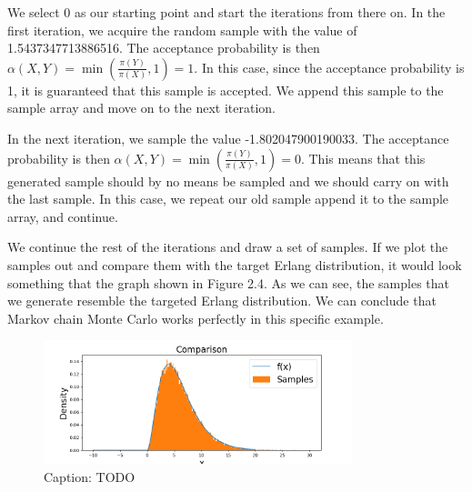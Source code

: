 We select 0 as our starting point and start the iterations from there on. In the first iteration, we acquire the random sample with the value of 1.5437347713886516. The acceptance probability is then $\alpha(X, Y) = \min (\frac{\pi(Y)}{\pi(X)}, 1) = 1$. In this case, since the acceptance probability is 1, it is guaranteed that this sample is accepted. We append this sample to the sample array and move on to the next iteration.

In the next iteration, we sample the value -1.802047900190033. The acceptance probability is then $\alpha(X, Y) = \min (\frac{\pi(Y)}{\pi(X)}, 1) = 0$. This means that this generated sample should by no means be sampled and we should carry on with the last sample. In this case, we repeat our old sample append it to the sample array, and continue.

We continue the rest of the iterations and draw a set of samples. If we plot the samples out and compare them with the target Erlang distribution, it would look something that the graph shown in Figure 2.4. As we can see, the samples that we generate resemble the targeted Erlang distribution. We can conclude that Markov chain Monte Carlo works perfectly in this specific example.

\begin{figure}
    \centering
    \includegraphics[width=0.8\textwidth]{figures/mcmc_example/result.png}
    \captionsetup{width=.8\textwidth}
    \caption{Caption: TODO}
    \label{fig:enter-label}
\end{figure}


